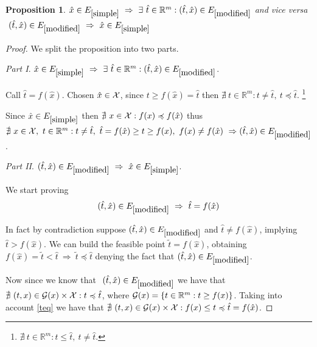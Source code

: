 \documentclass{article}
\newtheorem{proposition}[theorem]{Proposition}
\def\setR{\mathbb{R}}
\def\X{{\cal X}}
\begin{document}
	    
	    \begin{proposition}
	    	$\hat{x} \in { E}_{\ref{simple}} \ \Rightarrow \ \exists\  \hat{t} \in \setR^m : (\hat{t}, \hat{x}) \in { E}_{\ref{modified}}$
	    	and vice versa
	    	$\ (\hat{t}, \hat{x}) \in { E}_{\ref{modified}} \ \Rightarrow\ \hat{x} \in { E}_{\ref{simple}}$
	    \end{proposition}
	    \begin{proof} We split the proposition into two parts.
	    \medskip
	    
	    	\textit{Part I}. 	$\hat{x} \in { E}_{\ref{simple}} \ \Rightarrow \ \exists\  \hat{t} \in \setR^m : (\hat{t}, \hat{x}) \in { E}_{\ref{modified}}$.
	    	
	    	Call $\hat{t} = f(\hat{x})$. Chosen $\hat{x} \in \X$, since $t \ge f(\hat{x}) = \hat{t}$ then $\nexists \ t \in \setR^m : t \neq \hat{t}, \ t \preccurlyeq \hat{t}$. \footnote{$\nexists \ t \in \setR^m : t \le \hat{t},\ t \neq \hat{t}$.}
	    	
	    	Since $\hat{x} \in E_{\ref{simple}}$ then $\nexists\ x \in \X : f(x) \preccurlyeq f(\hat{x})$ thus $\nexists\ x \in \X,\  t \in \setR^m : t \neq \hat{t},\ \hat{t} = f(\hat{x}) \ge t \ge f(x), \ f(x) \neq f(\hat{x}) \ \Rightarrow (\hat{t}, \hat{x}) \in E_{\ref{modified}}$.
	    	\medskip
	    	
	    	 \textit{Part II}. $(\hat{t}, \hat{x}) \in { E}_{\ref{modified}} \ \Rightarrow\ \hat{x} \in { E}_{\ref{simple}}$.
	    	 
	    	 We start proving 
	    	 \begin{equation}\label{teq}
	    	 (\hat{t},\hat{x}) \in E_{\ref{modified}} \ \Rightarrow\ \hat{t} = f(\hat{x})
	    	 \end{equation}
	    	 
	    	  In fact by contradiction suppose  $(\hat{t},\hat{x}) \in E_{\ref{modified}}$ and $\hat{t} \neq f(\hat{x})$, implying $\hat{t} > f(\hat{x})$. We can build the feasible point $\tilde{t} = f(\hat{x})$, obtaining $f(\hat{x}) = \tilde{t} < \hat{t} \ \Rightarrow\  \tilde{t} \preccurlyeq \hat{t}$ denying  the fact that $(\hat{t},\hat{x}) \in E_{\ref{modified}}$.
	    	 \medskip 
	    	 
	    	 Now since we know that $\ (\hat{t}, \hat{x}) \in { E}_{\ref{modified}} $ we have that $\nexists\ (t,x) \in {\cal G}(x)\times \X : t \preccurlyeq \hat{t}$, where ${\cal G}(x) = \left\{t \in \setR^m : t \ge f(x)  \right\}$.
	    	 Taking into account \eqref{teq} we have that
	    	 $\nexists\ (t,x) \in {\cal G}(x)\times \X : f(x) \le t \preccurlyeq \hat{t} = f(\hat{x})$.
	    	 

\end{proof}
\end{document}
